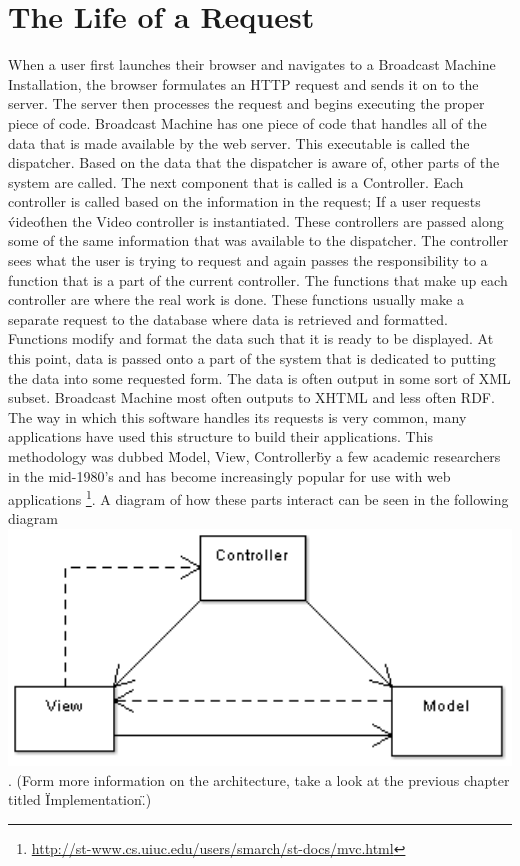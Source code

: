\documentclass[a4paper,12pt]{report}
\begin{document}
\section{The Life of a Request}
When a user first launches their browser and navigates to a Broadcast Machine Installation, the browser formulates an HTTP request and sends it on to the server.
The server then processes the request and begins executing the proper piece of code.
Broadcast Machine has one piece of code that handles all of the data that is made available by the web server.
This executable is called the dispatcher.
Based on the data that the dispatcher is aware of, other parts of the system are called.
The next component that is called is a Controller.
Each controller is called based on the information in the request; If a user requests \'video\' then the Video controller is instantiated.
These controllers are passed along some of the same information that was available to the dispatcher.
The controller sees what the user is trying to request and again passes the responsibility to a function that is a part of the current controller.
The functions that make up each controller are where the real work is done.
These functions usually make a separate request to the database where data is retrieved and formatted.
Functions modify and format the data such that it is ready to be displayed.
At this point, data is passed onto a part of the system that is dedicated to putting the data into some requested form.
The data is often output in some sort of XML subset.
Broadcast Machine most often outputs to XHTML and less often RDF.
The way in which this software handles its requests is very common, many applications have used this structure to build their applications.
This methodology was dubbed \"Model, View, Controller\" by a few academic researchers in the mid-1980's and has become increasingly popular for use with web applications \footnote{\url{http://st-www.cs.uiuc.edu/users/smarch/st-docs/mvc.html}}.
A diagram of how these parts interact can be seen in the following diagram \includegraphics[width=150mm]{images/mvc.png}.
(Form more information on the architecture, take a look at the previous chapter titled \"Implementation\".)
\end{document}
